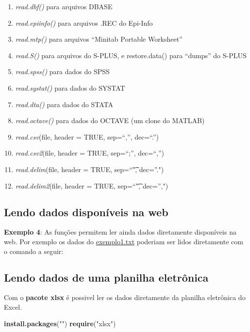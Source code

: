 \documentclass[
]{book}
\newenvironment{Shaded}{\begin{snugshade}}{\end{snugshade}}
\newcommand{\KeywordTok}[1]{\textcolor[rgb]{0.13,0.29,0.53}{\textbf{#1}}}
\newcommand{\NormalTok}[1]{#1}
\newcommand{\StringTok}[1]{\textcolor[rgb]{0.31,0.60,0.02}{#1}}
\providecommand{\tightlist}{%
  \setlength{\itemsep}{0pt}\setlength{\parskip}{0pt}}
\begin{document}
\begin{enumerate}
\def\labelenumi{\arabic{enumi}.}
\tightlist
\item
  \emph{read.dbf()} para arquivos DBASE
\item
  \emph{read.epiinfo()} para arquivos .REC do Epi-Info
\item
  \emph{read.mtp()} para arquivos ``Minitab Portable Worksheet''
\item
  \emph{read.S()} para arquivos do S-PLUS, e restore.data() para ``dumps'' do S-PLUS
\item
  \emph{read.spss()} para dados do SPSS
\item
  \emph{read.systat()} para dados do SYSTAT
\item
  \emph{read.dta()} para dados do STATA
\item
  \emph{read.octave()} para dados do OCTAVE (um clone do MATLAB)
\item
  \emph{read.csv}(file, header = TRUE, sep=``,'', dec=``.'')
\item
  \emph{read.csv2}(file, header = TRUE, sep=``;'', dec=``,'')
\item
  \emph{read.delim}(file, header = TRUE, sep=``\t", dec=''.")
\item
  \emph{read.delim2}(file, header = TRUE, sep=``\t", dec='',")
\end{enumerate}

\hypertarget{lendo-dados-disponuxedveis-na-web}{%
\subsection{Lendo dados disponíveis na web}\label{lendo-dados-disponuxedveis-na-web}}

\textbf{Exemplo 4}: As funções permitem ler ainda dados diretamente disponíveis na web. Por exemplo os dados do \href{https://www.dropbox.com/s/m7jivbbggei5y0x/exemplo1.txt?dl=1}{exemplo1.txt} poderiam ser lidos diretamente com o comando a seguir:

\hypertarget{lendo-dados-de-uma-planilha-eletruxf4nica}{%
\subsection{Lendo dados de uma planilha eletrônica}\label{lendo-dados-de-uma-planilha-eletruxf4nica}}

Com o \textbf{pacote xlsx} é possivel ler os dados diretamente da planilha eletrônica do Excel.

\begin{Shaded}
\begin{Highlighting}[]
\KeywordTok{install.packages}\NormalTok{(}\StringTok{""}\NormalTok{)}
\KeywordTok{require}\NormalTok{(}\StringTok{"xlsx"}\NormalTok{)}
\end{Highlighting}
\end{Shaded}
\end{document}
